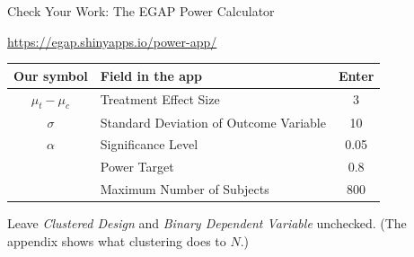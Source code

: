 \documentclass[
  ignorenonframetext,
  aspectratio=169,
]{beamer}
\begin{document}
\begin{frame}{Check Your Work: The EGAP Power Calculator}
\label{check-your-work-the-egap-power-calculator}
\vspace{0.3em}

\begin{center}
\small \url{https://egap.shinyapps.io/power-app/}
\end{center}

\vspace{0.6em}

\begin{center}
\small
\setlength{\tabcolsep}{7pt}
\renewcommand{\arraystretch}{1.25}
\begin{tabular}{c>{\raggedright\arraybackslash}p{6.4cm}c}
\toprule
\textbf{Our symbol} & \textbf{Field in the app} & \textbf{Enter} \\
\midrule
$\mu_t - \mu_c$ & Treatment Effect Size                  & 3    \\
$\sigma$        & Standard Deviation of Outcome Variable & 10   \\
$\alpha$        & Significance Level                     & 0.05 \\
                & Power Target                           & 0.8  \\
                & Maximum Number of Subjects             & 800  \\
\bottomrule
\end{tabular}
\end{center}

\vspace{0.5em}

\begin{center}
\small Leave \textit{Clustered Design} and \textit{Binary Dependent Variable} unchecked. (The appendix shows what clustering does to $N$.)
\end{center}
\end{frame}
\end{document}
